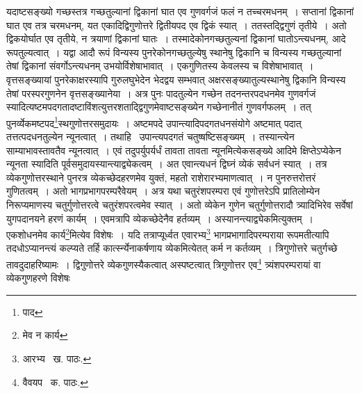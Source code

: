 \documentclass[11pt, openany]{book}
\begin{document}
\noindent यदाष्टसङ्ख्यो गच्छस्तत्र गच्छतुल्यानां द्विकानां घात एव गुणवर्गजं फलं न तच्चरमधनम्~। सप्तानां द्विकानां घात एव तत्र चरमधनम्, यत एकादिद्विगुणोत्तरे द्वितीयपद एव द्विकं स्यात्~। ततस्तद्द्विगुणं तृतीये~। अतो द्विकयोर्घात एव तृतीये, न त्रयाणां द्विकानां घातः~। तस्मादेकोनगच्छतुल्यनां द्विकानां घातोऽन्त्यधनम्, आदे रूपतुल्यत्वात्~। यद्वा आदौ रूपं विन्यस्य पुनरेकोनगच्छतुल्येषु स्थानेषु द्विकानि च विन्यस्य गच्छतुल्यानां तेषां द्विकानां संवर्गोऽन्त्यधनम् उभयोर्विशेषाभावात्~। एकगुणितस्य केवलस्य च विशेषाभावात्~। वृत्तसङ्ख्यायां पुनरेकाक्षरस्यापि गुरुलघुभेदेन भेदद्वय सम्भवात् अक्षरसङ्ख्यातुल्यस्थानेषु द्विकानि विन्यस्य तेषां परस्परगुणनेन वृत्तसङ्ख्यानेया~। अत्र पुनः पादतुल्येन गच्छेन तदनन्तरपदधनमेव गुणवर्गजं स्यादित्यष्टमपदगतादष्टाविंशत्युत्तरशताद्द्विगुणमेवाष्टसङ्ख्येन गच्छेनानीतं गुणवर्गफलम्~। तत् पुनर्व्येकमष्टपद\renewcommand{\thefootnote}{१}\footnote{पाद}स्थगुणोत्तरसमुदायः~। अष्टमपदे उपान्त्यादिपदगतधनसंयोगे अष्टमात् पदात् तत्तत्पदधनतुल्येन न्यूनत्वात्~। तथाहि \textendash\ उपान्त्यपदगतं चतुष्षष्टिसङ्ख्यम्~। तस्यान्त्येन साम्याभावस्तावतैव न्यूनत्वात्~। एवं तदुपर्युपर्यर्धं तावता तावता न्यूनमित्येकसङ्ख्ये आदिमे क्षिप्तेऽप्येकेन न्यूनता स्यादिति पूर्वसमुदायस्यान्त्याद्व्येकत्वम्~। अत एवान्त्यधनं द्विघ्नं व्येकं सर्वधनं स्यात्~। तत्र व्येकगुणोत्तरस्थाने पुनरत्र व्येकच्छेदहरणमेव युक्तं, महतो राशेरारभ्यमाणत्वात्~। न पुनरुत्तरोत्तरं गुणितत्वम्~। अतो भागप्रभागपरम्परैवेयम्~। अत्र यथा चतुरंशपरम्परा एवं गुणोत्तरेऽपि प्रातिलोम्येन निरूप्यमाणस्य चतुर्गुणोत्तरत्वे चतुरंशपरत्वमेव स्यात्~। अतो व्येकेन गुणेन चतुर्गुणोत्तरादौ त्र्यादिभिरेव सर्वेषां युगपदानयने हरणं कार्यम्~। एवमत्रापि व्येकच्छेदेनैव हर्तव्यम्~। अस्यानन्त्याद्व्येकमित्युक्तम्~। एकशोधनमेव कार्य\renewcommand{\thefootnote}{२}\footnote{मेव न कार्य}मित्येव विशेषः~।
यदि तत्राप्यूर्ध्वत एवारभ्य\renewcommand{\thefootnote}{३}\footnote{आरभ्य \textendash\ ख. पाठः.} भागप्रभागादिपरम्पराया रूपमतीत्यापि तदधोऽप्यानन्त्यं कल्प्यते तर्हि कार्त्स्न्येनाकर्षणाय व्येकमित्येतत् कर्म न
कर्तव्यम्~। त्रिगुणोत्तरे चतुर्गच्छे तावदुदाहरिष्यामः~। द्विगुणोत्तरे व्येकगुणस्यैकत्वात् अस्पष्टत्वात् त्रिगुणोत्तर एव\renewcommand{\thefootnote}{४}\footnote{वैवयप \textendash\ क. पाठः.} त्र्यंशपरम्परायां वा व्येकगुणहरणे
विशेषः

\newpage
\end{document}
